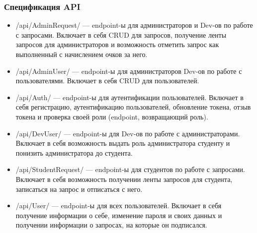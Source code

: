 \subsubsection{Спецификация API}

\begin{itemize}
	\item{/api/AdminRequest/ --- endpoint-ы для администраторов и Dev-ов по работе с запросами. Включает в себя CRUD для запросов, получение ленты запросов для администраторов и возможность отметить запрос как выполненный с начислением очков за него.}
	\item{/api/AdminUser/ --- endpoint-ы для администраторов Dev-ов по работе с пользователями. Включает в себя CRUD для пользователей.}
	\item{/api/Auth/ --- endpoint-ы для аутентификации пользователей. Включает в себя регистрацию, аутентификацию пользователей, обновление токена, отзыв токена и проверка своей роли (endpoint, возвращающий роль).}
	\item{/api/DevUser/ --- endpoint-ы для Dev-ов по работе с администраторами. Включает в себя возможность выдать роль администратора студенту и понизить администратора до студента.}
	\item{/api/StudentRequest/ --- endpoint-ы для студентов по работе с запросами. Включает в себя возможность получении ленты запросов для студента, записаться на запрос и отписаться с него.}
	\item{/api/User/ --- endpoint-ы для всех пользователей. Включает в себя получение информации о себе, изменение пароля и своих данных и получении информации о запросах, на которые он подписался.}
\end{itemize}
